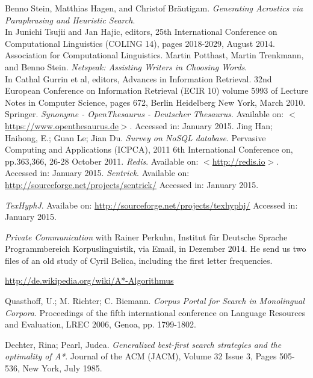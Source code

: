 \documentclass[11pt]{reportAlternative}
\begin{document}
\begin{thebibliography}{1}
	Benno Stein, Matthias Hagen, and Christof Bräutigam. \emph{Generating Acrostics via Paraphrasing and Heuristic Search}. \\
	In Junichi Tsujii and Jan Hajic, editors, 25th International Conference on Computational Linguistics (COLING 14), pages 2018-2029, August 2014. Association for Computational Linguistics.
	Martin Potthast, Martin Trenkmann, and Benno Stein.
	\emph{Netspeak: Assisting Writers in Choosing Words}. \\
	In Cathal Gurrin et al, editors, Advances in Information Retrieval. 32nd European Conference on Information Retrieval (ECIR 10) volume 5993 of Lecture Notes in Computer Science, pages 672, Berlin Heidelberg New York, March 2010. Springer.
	\emph{Synonyme - OpenThesaurus - Deutscher Thesaurus}.
	Available on: $<$\url{https://www.openthesaurus.de}$>$.
	Accessed in: January 2015.
	Jing Han; Haihong, E.; Guan Le; Jian Du. \emph{Survey on NoSQL database}. Pervasive Computing and Applications (ICPCA), 2011 6th International Conference on, pp.363,366, 26-28 October 2011.
	\emph{Redis}.
	Available on: $<$\url{http://redis.io}$>$.
	Accessed in: January 2015.
\emph{Sentrick}.
Available on: \url{http://sourceforge.net/projects/sentrick/}
Accessed in: January 2015.


\emph{TexHyphJ}.
Availabe on: \url{http://sourceforge.net/projects/texhyphj/}
Accessed in: January 2015.

\emph{Private Communication} with Rainer Perkuhn,
Institut für Deutsche Sprache Programmbereich Korpuslinguistik, via Email, in Dezember 2014. He send us two files of an old study of Cyril Belica, including the first letter frequencies.  

\url{http://de.wikipedia.org/wiki/A*-Algorithmus}

	Quasthoff, U.; M. Richter; C. Biemann. \emph{Corpus Portal for Search in Monolingual Corpora}. Proceedings of the fifth international conference on Language Resources and Evaluation, LREC 2006, Genoa, pp. 1799-1802.

	Dechter, Rina; Pearl, Judea. \emph{Generalized best-first search strategies and the optimality of A*}. Journal of the ACM (JACM), Volume 32 Issue 3, Pages 505-536, New York, July 1985.
\end{thebibliography}

\end{document}
